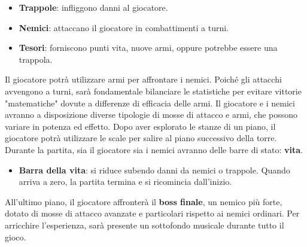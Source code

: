 \documentclass[a4paper,12pt]{report}
\begin{document}
\begin{itemize}
    \item \textbf{Trappole}: infliggono danni al giocatore.
    \item \textbf{Nemici}: attaccano il giocatore in combattimenti a turni.
    \item \textbf{Tesori}: forniscono punti vita, nuove armi, oppure potrebbe essere una trappola.
\end{itemize}
%
Il giocatore potrà utilizzare armi per affrontare i nemici. Poiché gli attacchi avvengono a turni, 
%
sarà fondamentale bilanciare le statistiche per evitare vittorie "matematiche" dovute a differenze di efficacia delle armi. 
%
Il giocatore e i nemici avranno a disposizione diverse tipologie di mosse di attacco e armi, che possono variare in potenza ed effetto.
%
Dopo aver esplorato le stanze di un piano, il giocatore potrà utilizzare le scale per salire al piano successivo della torre. 
%
Durante la partita, sia il giocatore sia i nemici avranno delle barre di stato: \textbf{vita}.
%
\begin{itemize}
    \item \textbf{Barra della vita}: si riduce subendo danni da nemici o trappole. Quando arriva a zero, la partita termina e si ricomincia dall'inizio.
\end{itemize}
%
All’ultimo piano, il giocatore affronterà il \textbf{boss finale}, un nemico più forte, dotato di mosse di attacco avanzate e particolari rispetto ai nemici ordinari.
%
Per arricchire l’esperienza, sarà presente un sottofondo musicale durante tutto il gioco.
%
\end{document}
